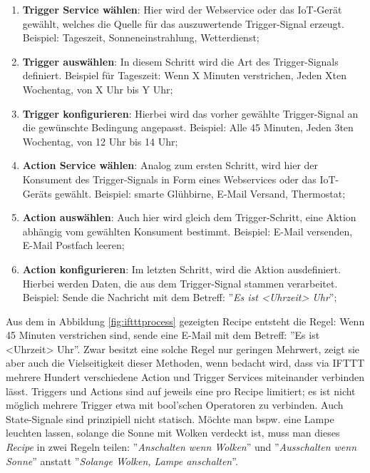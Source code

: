 \begin{enumerate}
    \item \textbf{Trigger Service wählen}: Hier wird der Webservice oder das IoT-Gerät gewählt, welches die Quelle für das auszuwertende Trigger-Signal erzeugt. Beispiel: Tageszeit, Sonneneinstrahlung, Wetterdienst;
    \item \textbf{Trigger auswählen}: In diesem Schritt wird die Art des Trigger-Signals definiert. Beispiel für Tageszeit: Wenn X Minuten verstrichen, Jeden Xten Wochentag, von X Uhr bis Y Uhr;
    \item \textbf{Trigger konfigurieren}: Hierbei wird das vorher gewählte Trigger-Signal an die gewünschte Bedingung angepasst. Beispiel: Alle 45 Minuten, Jeden 3ten Wochentag, von 12 Uhr bis 14 Uhr;
    \item \textbf{Action Service wählen}: Analog zum ersten Schritt, wird hier der Konsument des Trigger-Signals in Form eines Webservices oder das IoT-Geräts gewählt. Beispiel: smarte Glühbirne, E-Mail Versand, Thermostat;
    \item \textbf{Action auswählen}: Auch hier wird gleich dem Trigger-Schritt, eine Aktion abhängig vom gewählten Konsument bestimmt. Beispiel: E-Mail versenden, E-Mail Postfach leeren;
    \item \textbf{Action konfigurieren}: Im letzten Schritt, wird die Aktion ausdefiniert. Hierbei werden Daten, die aus dem Trigger-Signal stammen verarbeitet. Beispiel: Sende die Nachricht mit dem Betreff: ''\textit{Es ist <Uhrzeit> Uhr}'';
\end{enumerate}
Aus dem in Abbildung \ref{fig:iftttprocess} gezeigten Recipe entsteht die Regel: Wenn 45 Minuten verstrichen sind, sende eine E-Mail mit dem Betreff: ''Es ist <Uhrzeit> Uhr''. Zwar besitzt eine solche Regel nur geringen Mehrwert, zeigt sie aber auch die Vielseitigkeit dieser Methoden, wenn bedacht wird, dass via IFTTT mehrere Hundert verschiedene Action und Trigger Services miteinander verbinden lässt. Triggers und Actions sind auf jeweils eine pro Recipe limitiert; es ist nicht möglich mehrere Trigger etwa mit bool'schen Operatoren zu verbinden. Auch State-Signale sind prinzipiell nicht statisch. Möchte man bspw. eine Lampe leuchten lassen, solange die Sonne mit Wolken verdeckt ist, muss man dieses \textit{Recipe} in zwei Regeln teilen: ''\textit{Anschalten wenn Wolken}'' und ''\textit{Ausschalten wenn Sonne}'' anstatt ''\textit{Solange Wolken, Lampe anschalten}''.

